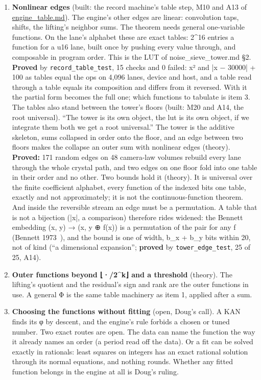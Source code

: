 \begin{enumerate}
\item \textbf{Nonlinear edges} (built: the record machine's table step, M10 and A13 of \hyperref[chap:engine-table]{engine\_\allowbreak{}table.md}). The engine's other edges are linear: convolution taps, shifts, the lifting's neighbor sums. The theorem needs general one-variable functions. On the lane's alphabet these are exact tables: 2\textasciicircum{}16 entries a function for a u16 lane, built once by pushing every value through, and composable in program order. This is the LUT of noise\_\allowbreak{}sieve\_\allowbreak{}tower.md §2. \textbf{Proved} by \texttt{record\_\allowbreak{}table\_\allowbreak{}test}, 15 checks and 0 failed: x² and |x − 30000| + 100 as tables equal the ops on 4,096 lanes, device and host, and a table read through a table equals its composition and differs from it reversed. With it the partial form becomes the full one; which functions to tabulate is item 3. The tables also stand between the tower's floors (built: M20 and A14, the root universal). “The tower is its own object, the lut is its own object, if we integrate them both we get a root universal.” The tower is the additive skeleton, sums collapsed in order onto the floor, and an edge between two floors makes the collapse an outer sum with nonlinear edges (theory). \textbf{Proved:} 171 random edges on 48 camera-law volumes rebuild every lane through the whole crystal path, and two edges on one floor fold into one table in their order and no other. Two bounds hold it (theory). It is universal over the finite coefficient alphabet, every function of the indexed bits one table, exactly and not approximately; it is not the continuous-function theorem. And inside the reversible stream an edge must be a permutation. A table that is not a bijection (|x|, a comparison) therefore rides widened: the Bennett embedding (x, y) → (x, y ⊕ f(x)) is a permutation of the pair for any f (Bennett 1973~\cite{src:Bennett-1973}), and the bound is one of width, b\_\allowbreak{}x + b\_\allowbreak{}y bits within 20, not of kind (“a dimensional expansion”; \textbf{proved} by \texttt{tower\_\allowbreak{}edge\_\allowbreak{}test}, 25 of 25, A14).
\item \textbf{Outer functions beyond ⌊·/2\textasciicircum{}k⌋ and a threshold} (theory). The lifting's quotient and the residual's sign and rank are the outer functions in use. A general Φ is the same table machinery as item 1, applied after a sum.
\item \textbf{Choosing the functions without fitting} (open, Doug's call). A KAN finds its φ by descent, and the engine's rule forbids a chosen or tuned number. Two exact routes are open. The data can name the function the way it already names an order (a period read off the data). Or a fit can be solved exactly in rationals: least squares on integers has an exact rational solution through its normal equations, and nothing rounds. Whether any fitted function belongs in the engine at all is Doug's ruling.

\end{enumerate}
